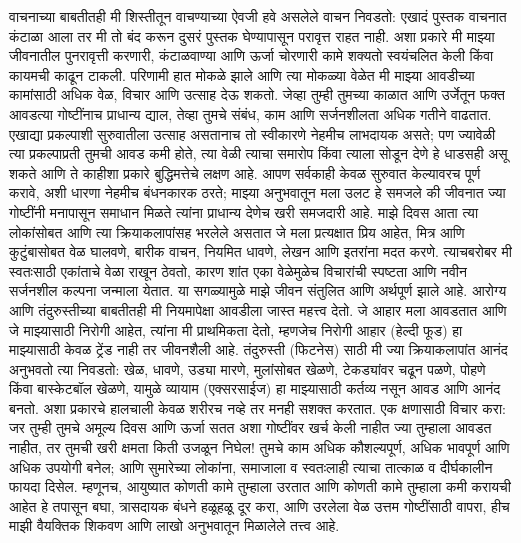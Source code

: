 वाचनाच्या बाबतीतही मी शिस्तीतून वाचण्याच्या ऐवजी हवे असलेले वाचन निवडतो: एखादं पुस्तक वाचनात कंटाळा आला तर मी तो बंद करून दुसरं पुस्तक घेण्यापासून परावृत्त राहत नाही. अशा प्रकारे मी माझ्या जीवनातील पुनरावृत्ती करणारी, कंटाळवाण्या आणि ऊर्जा चोरणारी कामे शक्यतो स्वयंचलित केली किंवा कायमची काढून टाकली. परिणामी हात मोकळे झाले आणि त्या मोकळ्या वेळेत मी माझ्या आवडीच्या कामांसाठी अधिक वेळ, विचार आणि उत्साह देऊ शकतो.
जेव्हा तुम्ही तुमच्या काळात आणि उर्जेतून फक्त आवडत्या गोष्टींनाच प्राधान्य द्याल, तेव्हा तुमचे संबंध, काम आणि सर्जनशीलता अधिक गतीने वाढतात. एखाद्या प्रकल्पाशी सुरुवातीला उत्साह असतानाच तो स्वीकारणे नेहमीच लाभदायक असते; पण ज्यावेळी त्या प्रकल्पाप्रती तुमची आवड कमी होते, त्या वेळी त्याचा समारोप किंवा त्याला सोडून देणे हे धाडसही असू शकते आणि ते काहीशा प्रकारे बुद्धिमत्तेचे लक्षण आहे. आपण सर्वकाही केवळ सुरुवात केल्यावरच पूर्ण करावे, अशी धारणा नेहमीच बंधनकारक ठरते; माझ्या अनुभवातून मला उलट हे समजले की जीवनात ज्या गोष्टींनी मनापासून समाधान मिळते त्यांना प्राधान्य देणेच खरी समजदारी आहे.
माझे दिवस आता त्या लोकांसोबत आणि त्या क्रियाकलापांसह भरलेले असतात जे मला प्रत्यक्षात प्रिय आहेत, मित्र आणि कुटुंबासोबत वेळ घालवणे, बारीक वाचन, नियमित धावणे, लेखन आणि इतरांना मदत करणे. त्याचबरोबर मी स्वतःसाठी एकांताचे वेळा राखून ठेवतो, कारण शांत एका वेळेमुळेच विचारांची स्पष्टता आणि नवीन सर्जनशील कल्पना जन्माला येतात. या सगळ्यामुळे माझे जीवन संतुलित आणि अर्थपूर्ण झाले आहे.
आरोग्य आणि तंदुरुस्तीच्या बाबतीतही मी नियमापेक्षा आवडीला जास्त महत्त्व देतो. जे आहार मला आवडतात आणि जे माझ्यासाठी निरोगी आहेत, त्यांना मी प्राथमिकता देतो, म्हणजेच निरोगी आहार (हेल्दी फूड) हा माझ्यासाठी केवळ ट्रेंड नाही तर जीवनशैली आहे. तंदुरुस्ती (फिटनेस) साठी मी ज्या क्रियाकलापांत आनंद अनुभवतो त्या निवडतो: खेळ, धावणे, उड्या मारणे, मुलांसोबत खेळणे, टेकड्यांवर चढून पळणे, पोहणे किंवा बास्केटबॉल खेळणे, यामुळे व्यायाम (एक्सरसाईज) हा माझ्यासाठी कर्तव्य नसून आवड आणि आनंद बनतो. अशा प्रकारचे हालचाली केवळ शरीरच नव्हे तर मनही सशक्त करतात.
एक क्षणासाठी विचार करा: जर तुम्ही तुमचे अमूल्य दिवस आणि ऊर्जा सतत अशा गोष्टींवर खर्च केली नाहीत ज्या तुम्हाला आवडत नाहीत, तर तुमची खरी क्षमता किती उजळून निघेल! तुमचे काम अधिक कौशल्यपूर्ण, अधिक भावपूर्ण आणि अधिक उपयोगी बनेल; आणि सुमारेच्या लोकांना, समाजाला व स्वतःलाही त्याचा तात्काळ व दीर्घकालीन फायदा दिसेल. म्हणूनच, आयुष्यात कोणती कामे तुम्हाला उरतात आणि कोणती कामे तुम्हाला कमी करायची आहेत हे तपासून बघा, त्रासदायक बंधने हळूहळू दूर करा, आणि उरलेला वेळ उत्तम गोष्टींसाठी वापरा, हीच माझी वैयक्तिक शिकवण आणि लाखो अनुभवातून मिळालेले तत्त्व आहे.

